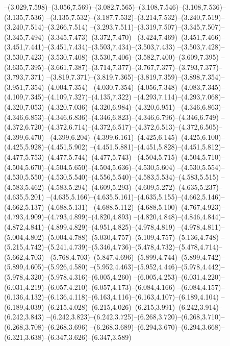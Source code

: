   --(3.029,7.598)--(3.056,7.569)--(3.082,7.565)--(3.108,7.546)--(3.108,7.536)--(3.135,7.536)%
  --(3.135,7.532)--(3.187,7.532)--(3.214,7.532)--(3.240,7.519)--(3.240,7.514)--(3.266,7.514)%
  --(3.293,7.511)--(3.319,7.507)--(3.345,7.507)--(3.345,7.494)--(3.345,7.473)--(3.372,7.470)%
  --(3.424,7.469)--(3.451,7.466)--(3.451,7.441)--(3.451,7.434)--(3.503,7.434)--(3.503,7.433)%
  --(3.503,7.428)--(3.530,7.423)--(3.530,7.408)--(3.530,7.406)--(3.582,7.400)--(3.609,7.395)%
  --(3.635,7.395)--(3.661,7.387)--(3.714,7.377)--(3.767,7.377)--(3.793,7.377)--(3.793,7.371)%
  --(3.819,7.371)--(3.819,7.365)--(3.819,7.359)--(3.898,7.354)--(3.951,7.354)--(4.004,7.354)%
  --(4.030,7.354)--(4.056,7.348)--(4.083,7.345)--(4.109,7.345)--(4.109,7.327)--(4.135,7.322)%
  --(4.293,7.114)--(4.293,7.068)--(4.320,7.053)--(4.320,7.036)--(4.320,6.984)--(4.320,6.951)%
  --(4.346,6.863)--(4.346,6.853)--(4.346,6.836)--(4.346,6.823)--(4.346,6.796)--(4.346,6.749)%
  --(4.372,6.720)--(4.372,6.714)--(4.372,6.517)--(4.372,6.513)--(4.372,6.505)--(4.399,6.470)%
  --(4.399,6.204)--(4.399,6.161)--(4.425,6.145)--(4.425,6.100)--(4.425,5.928)--(4.451,5.902)%
  --(4.451,5.881)--(4.451,5.828)--(4.451,5.812)--(4.477,5.753)--(4.477,5.744)--(4.477,5.743)%
  --(4.504,5.715)--(4.504,5.710)--(4.504,5.670)--(4.504,5.650)--(4.504,5.636)--(4.530,5.604)%
  --(4.530,5.554)--(4.530,5.550)--(4.530,5.540)--(4.556,5.540)--(4.583,5.534)--(4.583,5.515)%
  --(4.583,5.462)--(4.583,5.294)--(4.609,5.293)--(4.609,5.272)--(4.635,5.237)--(4.635,5.201)%
  --(4.635,5.166)--(4.635,5.161)--(4.635,5.155)--(4.662,5.146)--(4.662,5.137)--(4.688,5.131)%
  --(4.688,5.112)--(4.688,5.100)--(4.767,4.923)--(4.793,4.909)--(4.793,4.899)--(4.820,4.893)%
  --(4.820,4.848)--(4.846,4.844)--(4.872,4.841)--(4.899,4.829)--(4.951,4.825)--(4.978,4.819)%
  --(4.978,4.811)--(5.004,4.802)--(5.004,4.788)--(5.030,4.757)--(5.109,4.757)--(5.136,4.748)%
  --(5.215,4.742)--(5.241,4.739)--(5.346,4.736)--(5.478,4.732)--(5.478,4.714)--(5.662,4.703)%
  --(5.768,4.703)--(5.847,4.696)--(5.899,4.744)--(5.899,4.742)--(5.899,4.605)--(5.926,4.580)%
  --(5.952,4.463)--(5.952,4.446)--(5.978,4.442)--(5.978,4.320)--(5.978,4.316)--(6.005,4.260)%
  --(6.005,4.253)--(6.031,4.220)--(6.031,4.219)--(6.057,4.210)--(6.057,4.173)--(6.084,4.166)%
  --(6.084,4.157)--(6.136,4.132)--(6.136,4.118)--(6.163,4.116)--(6.163,4.107)--(6.189,4.104)%
  --(6.189,4.039)--(6.215,4.028)--(6.215,4.026)--(6.215,3.991)--(6.242,3.914)--(6.242,3.843)%
  --(6.242,3.823)--(6.242,3.725)--(6.268,3.720)--(6.268,3.710)--(6.268,3.708)--(6.268,3.696)%
  --(6.268,3.689)--(6.294,3.670)--(6.294,3.668)--(6.321,3.638)--(6.347,3.626)--(6.347,3.589)%
